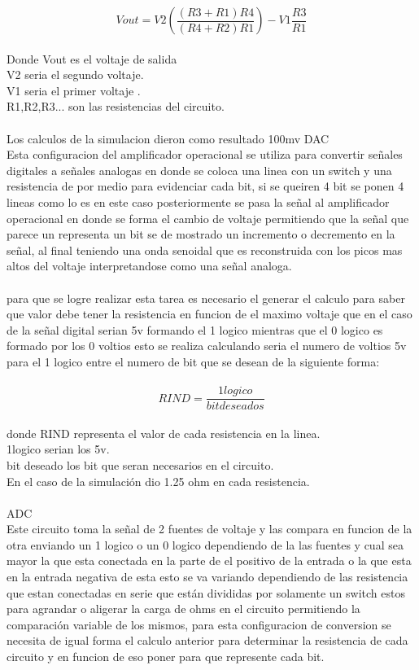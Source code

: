 \documentclass[13pt]{article}
\begin{document}
$$ Vout=V2(\frac{(R3+R1)R4}{(R4+R2)R1})-V1\frac{R3}{R1}$$\\
Donde Vout es el voltaje de salida\\
V2 seria el segundo voltaje.\\
V1 seria el primer voltaje .\\
R1,R2,R3... son las resistencias del circuito.\\ 
\\Los calculos de la simulacion dieron como resultado 100mv
DAC\\
Esta configuracion del amplificador operacional se utiliza para convertir señales digitales a señales analogas en donde se coloca una linea con un switch y una resistencia de por medio para evidenciar cada bit, si se queiren 4 bit se ponen 4 lineas como lo es en este caso posteriormente se pasa la señal al amplificador operacional en donde se forma el cambio de voltaje permitiendo que la señal que parece un representa un bit se de mostrado un incremento o decremento en la señal, al final teniendo una onda senoidal que es reconstruida con los picos mas altos del voltaje interpretandose como una señal analoga.\\\\
para que  se logre realizar esta tarea es necesario el generar el calculo para saber que valor debe tener la resistencia en funcion de el maximo voltaje que en el caso de la señal digital serian 5v formando el 1 logico mientras que el 0 logico es formado por los 0 voltios esto se realiza calculando seria el numero de voltios 5v para el 1 logico entre el numero de bit que se desean de la siguiente forma:\\\\
$$RIND=\frac{1logico}{bit deseados}$$\\
donde RIND representa el valor de cada resistencia en la linea.\\
1logico serian los 5v.\\
bit deseado los bit que seran necesarios en el circuito.\\
En el caso de la simulación dio 1.25 ohm en cada resistencia.\\\\

ADC\\
Este circuito toma la señal de 2 fuentes de voltaje y las compara en funcion de la otra enviando un 1 logico o un 0 logico dependiendo de la las fuentes y cual sea mayor la que esta conectada en la parte de el positivo de la entrada o la que esta en la entrada negativa de esta esto se va variando dependiendo de las resistencia que estan conectadas en serie que están divididas por solamente un switch estos para agrandar o aligerar la carga de ohms en el circuito permitiendo la comparación variable de los mismos, para esta configuracion de conversion se necesita de igual forma el calculo anterior para determinar la resistencia de cada circuito y en funcion de eso poner para que represente cada bit.\\
 
\end{document}
